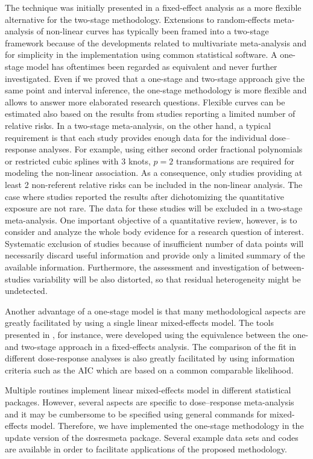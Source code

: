 \documentclass[11pt,a4paper,twoside,openany]{book}\usepackage{knitr}
\newcommand{\pkg}[1]{{\fontseries{b}\selectfont #1}}
\begin{document}
{The technique was initially presented in a fixed-effect analysis as a more flexible alternative for the two-stage methodology. Extensions to random-effects meta-analysis of non-linear curves has typically been framed into a two-stage framework because of the developments related to multivariate meta-analysis and for simplicity in the implementation using common statistical software.  A one-stage model has oftentimes been regarded as equivalent and never further investigated. Even if we proved that a one-stage and two-stage approach give the same point and interval inference, the one-stage methodology is more flexible and allows to answer more elaborated research questions. Flexible curves can be estimated also based on the results from studies reporting a limited number of relative risks. In a two-stage meta-analysis, on the other hand, a typical requirement is that each study provides enough data for the individual dose--response analyses. For example, using either second order fractional polynomials or restricted cubic splines with 3 knots, $p = 2$ transformations are required for modeling the non-linear association. As a consequence, only studies providing at least 2 non-referent relative risks can be included in the non-linear analysis. The case where studies reported the results after dichotomizing the quantitative exposure are not rare. The data for these studies will be excluded in a two-stage meta-analysis. One important objective of a quantitative review, however, is to consider and analyze the whole body evidence for a research question of interest. Systematic exclusion of studies because of insufficient number of data points will necessarily discard useful information and provide only a limited summary of the available information. Furthermore, the assessment and investigation of between-studies variability will be also distorted, so that residual heterogeneity might be undetected. 

Another advantage of a one-stage model is that many methodological aspects are greatly facilitated by using a single linear mixed-effects model. The tools presented in , for instance, were developed using the equivalence between the one- and two-stage approach in a fixed-effects analysis. The comparison of the fit in different dose-response analyses is also greatly facilitated by using information criteria such as the AIC which are based on a common comparable likelihood.

Multiple routines implement linear mixed-effects model in different statistical packages. However, several aspects are specific to dose--response meta-analysis and it may be cumbersome to be specified using general commands for mixed-effects model. Therefore, we have implemented the one-stage methodology in the update version of the \pkg{dosresmeta} package. Several example data sets and codes are available in order to facilitate applications of the proposed methodology.

}
\end{document}
